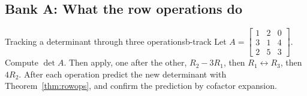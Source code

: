 \documentclass[11pt]{article}
\begin{document}
\subsection*{Bank A: What the row operations do}

\begin{exmp}{Tracking a determinant through three operations}{b-track}
Let $A=\begin{bmatrix}1&2&0\\3&1&4\\2&5&3\end{bmatrix}$. Compute $\det A$. Then apply, one after the other, $R_2-3R_1$, then $R_1\leftrightarrow R_3$, then $4R_2$. After each operation predict the new determinant with Theorem~\ref{thm:rowops}, and confirm the prediction by cofactor expansion.


\end{exmp}
\end{document}
